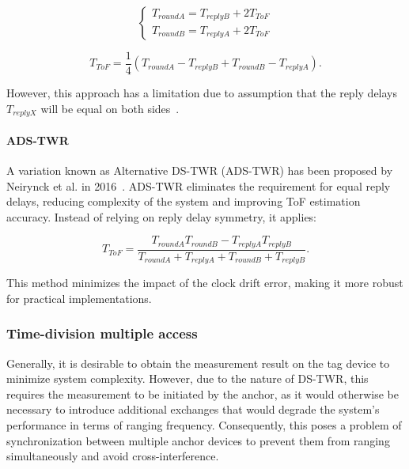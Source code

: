 \begin{equation}
\begin{cases}
T_{roundA} = T_{replyB} + 2T_{ToF}\\
T_{roundB} = T_{replyA} + 2T_{ToF}
\end{cases}
\end{equation}

\begin{equation}
T_{ToF} = \frac{1}{4} (T_{roundA} - T_{replyB} + T_{roundB} - T_{replyA}).
\end{equation}

However, this approach has a limitation due to assumption that the reply delays $T_{replyX}$ will be equal on both sides~\cite{neirynck2016alternative}. 

\paragraph{ADS-TWR}\label{adstwr}
A variation known as Alternative DS-TWR (ADS-TWR) has been proposed by Neirynck et al. in 2016~\cite{neirynck2016alternative}. ADS-TWR eliminates the requirement for equal reply delays, reducing complexity of the system and improving ToF estimation accuracy. Instead of relying on reply delay symmetry, it applies:

\begin{equation}
T_{ToF} = \frac{T_{roundA}T_{roundB} - T_{replyA}T_{replyB}}{T_{roundA} + T_{replyA} + T_{roundB} + T_{replyB}}.
\end{equation}

This method minimizes the impact of the clock drift error, making it more robust for practical implementations.

\subsubsection{Time-division multiple access}\label{tdma}


Generally, it is desirable to obtain the measurement result on the tag device to minimize system complexity. However, due to the nature of DS-TWR, this requires the measurement to be initiated by the anchor, as it would otherwise be necessary to introduce additional exchanges that would degrade the system's performance in terms of ranging frequency. Consequently, this poses a problem of synchronization between multiple anchor devices to prevent them from ranging simultaneously and avoid cross-interference. 

